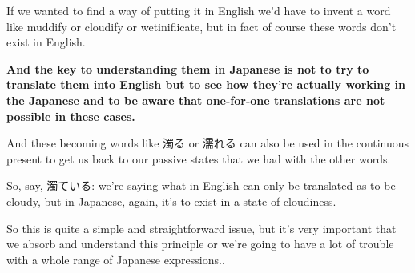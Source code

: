 If we wanted to find a way of putting it in English we'd have to invent a word like muddify or cloudify or wetiniflicate, but in fact of course these words don't exist in English.

{\bf And the key to understanding them in Japanese is not to try to translate them into English but to see how they're actually working in the Japanese and to be aware that one-for-one translations are not possible in these cases.}

And these becoming words like 濁る or 濡れる can also be used in the continuous present to get us back to our passive states that we had with the other words.

So, say, 濁ている: we're saying what in English can only be translated as to be cloudy, but in Japanese, again, it's to exist in a state of cloudiness.

So this is quite a simple and straightforward issue, but it's very important that we absorb and understand this principle or we're going to have a lot of trouble with a whole range of Japanese expressions..

\stopsectionlevel
